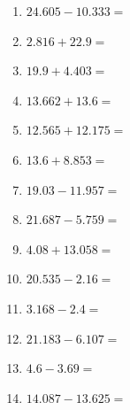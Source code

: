 \documentclass[12pt]{article}
\begin{document}
\begin{enumerate}
\item \large $ 24.605 - 10.333 = $ \vspace{1.5cm}
\item \large $ 2.816 + 22.9 = $ \vspace{1.5cm}
\item \large $ 19.9 + 4.403 = $ \vspace{1.5cm}
\item \large $ 13.662 + 13.6 = $ \vspace{1.5cm}
\newpage
\item \large $ 12.565 + 12.175 = $ \vspace{1.5cm}
\item \large $ 13.6 + 8.853 = $ \vspace{1.5cm}
\item \large $ 19.03 - 11.957 = $ \vspace{1.5cm}
\item \large $ 21.687 - 5.759 = $ \vspace{1.5cm}
\item \large $ 4.08 + 13.058 = $ \vspace{1.5cm}
\item \large $ 20.535 - 2.16 = $ \vspace{1.5cm}
\item \large $ 3.168 - 2.4 = $ \vspace{1.5cm}
\item \large $ 21.183 - 6.107 = $ \vspace{1.5cm}
\item \large $ 4.6 - 3.69 = $ \vspace{1.5cm}
\item \large $ 14.087 - 13.625 = $ \vspace{1.5cm}
\end{enumerate}\newpage
\end{document}
